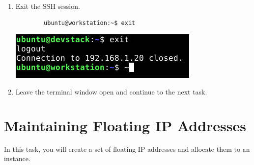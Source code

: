 \documentclass[letterpaper, 12pt]{article}
\begin{document}
\begin{enumerate}
    \item Exit the SSH session.
    \begin{lstlisting}
        ubuntu@workstation:~$ exit
    \end{lstlisting}

    \begin{center}
        \includegraphics[width=\linewidth]{images/part2/step19.png}
    \end{center}

    \item Leave the terminal window open and continue to the next task.

\end{enumerate}

\section{Maintaining Floating IP Addresses}
\label{sec:maintaining_floating_ip_addresses}
In this task, you will create a set of floating IP addresses and allocate them to an instance.
\end{document}
